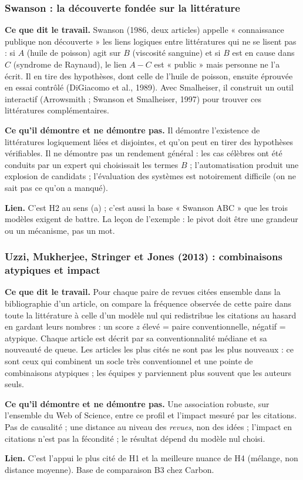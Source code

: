 \documentclass[a4paper,11pt]{article}
\newcommand{\cours}[1]{\par\smallskip\textbf{\textsf{#1}}\enspace}
\begin{document}
\subsubsection{Swanson : la découverte fondée sur la littérature}
\cours{Ce que dit le travail.} Swanson (1986, deux articles) appelle « connaissance publique non découverte » les liens logiques entre littératures qui ne se lisent pas : si $A$ (huile de poisson) agit sur $B$ (viscosité sanguine) et si $B$ est en cause dans $C$ (syndrome de Raynaud), le lien $A\!-\!C$ est « public » mais personne ne l'a écrit. Il en tire des hypothèses, dont celle de l'huile de poisson, ensuite éprouvée en essai contrôlé (DiGiacomo et al., 1989). Avec Smalheiser, il construit un outil interactif (Arrowsmith ; Swanson et Smalheiser, 1997) pour trouver ces littératures complémentaires.
\cours{Ce qu'il démontre et ne démontre pas.} Il démontre l'existence de littératures logiquement liées et disjointes, et qu'on peut en tirer des hypothèses vérifiables. Il ne démontre pas un rendement général : les cas célèbres ont été conduits par un expert qui choisissait les termes $B$ ; l'automatisation produit une explosion de candidats ; l'évaluation des systèmes est notoirement difficile (on ne sait pas ce qu'on a manqué).
\cours{Lien.} C'est H2 au sens (a) ; c'est aussi la base « Swanson ABC » que les trois modèles exigent de battre. La leçon de l'exemple : le pivot doit être une grandeur ou un mécanisme, pas un mot.

\subsubsection{Uzzi, Mukherjee, Stringer et Jones (2013) : combinaisons atypiques et impact}
\cours{Ce que dit le travail.} Pour chaque paire de revues citées ensemble dans la bibliographie d'un article, on compare la fréquence observée de cette paire dans toute la littérature à celle d'un modèle nul qui redistribue les citations au hasard en gardant leurs nombres : un score $z$ élevé = paire conventionnelle, négatif = atypique. Chaque article est décrit par sa conventionnalité médiane et sa nouveauté de queue. Les articles les plus cités ne sont pas les plus nouveaux : ce sont ceux qui combinent un socle très conventionnel et une pointe de combinaisons atypiques ; les équipes y parviennent plus souvent que les auteurs seuls.
\cours{Ce qu'il démontre et ne démontre pas.} Une association robuste, sur l'ensemble du Web of Science, entre ce profil et l'impact mesuré par les citations. Pas de causalité ; une distance au niveau des \emph{revues}, non des idées ; l'impact en citations n'est pas la fécondité ; le résultat dépend du modèle nul choisi.
\cours{Lien.} C'est l'appui le plus cité de H1 et la meilleure nuance de H4 (mélange, non distance moyenne). Base de comparaison B3 chez Carbon.
\end{document}
